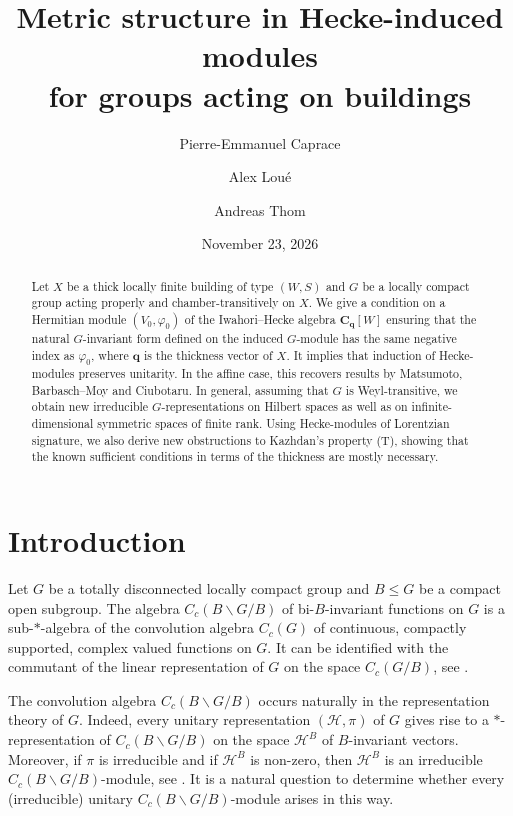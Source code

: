 \documentclass[12pt,a4paper]{amsproc}
\title[Metric structure in Hecke-induced modules]
{Metric structure in Hecke-induced modules\\ for  groups acting on buildings}
\author[P.-E. Caprace]{Pierre-Emmanuel Caprace}
\author[A. Lou\'e]{Alex Lou\'e}
\author[A. Thom]{Andreas Thom}
\date{November 23, 2026}
\theoremstyle{definition}
\newcommand{\CC}{\mathbf C}
\newcommand{\qq}{\mathbf q}
\begin{document}
\begin{abstract}
Let $X$ be a thick locally finite building of type $(W, S)$ and $G$ be a locally compact group acting properly and chamber-transitively on $X$. We give a condition on a Hermitian module $(V_0, \varphi_0)$ of the Iwahori--Hecke algebra $\CC_\qq[W]$ ensuring that the natural $G$-invariant form defined on the induced $G$-module has the same negative index as $\varphi_0$, where $\qq$ is the thickness vector of $X$. It implies that induction of Hecke-modules preserves unitarity. In the affine case, this recovers results by Matsumoto, Barbasch--Moy and Ciubotaru. In general, assuming that $G$ is Weyl-transitive, we obtain new irreducible $G$-representations  on Hilbert spaces as well as on infinite-dimensional symmetric spaces of finite rank. Using Hecke-modules of    Lorentzian signature, we also derive new obstructions to Kazhdan's property (T), showing that the known sufficient conditions in terms of the thickness are mostly necessary. 
\end{abstract}

\maketitle


\section{Introduction}
\label{sec:introduction}

Let $G$ be a totally disconnected locally compact group and $B \leq G$ be a compact open subgroup. The   algebra $C_c(B\backslash G/B)$ of bi-$B$-invariant functions on $G$ is a sub-$*$-algebra of the convolution algebra $C_c(G)$ of continuous, compactly supported, complex valued functions on $G$. It can be identified with the commutant of the linear representation of $G$ on the space $C_c(G/B)$, see \cite[Ch.~IV, Exer.~22]{Bour}. 

The  convolution algebra $C_c(B\backslash G/B)$  occurs    naturally in the representation theory of $G$. Indeed,   every unitary representation $(\mathcal H, \pi)$ of $G$ gives rise to a $*$-representation of $C_c(B\backslash G/B)$ on  the space $\mathcal H^B$ of $B$-invariant vectors. Moreover, if $\pi$ is irreducible and if $\mathcal H^B$ is non-zero, then $\mathcal H^B$ is an irreducible $C_c(B\backslash G/B)$-module, see \cite[Ch.~IV, Theorem 2]{Lang}. It is a natural question to determine whether every (irreducible) unitary $C_c(B\backslash G/B)$-module arises in this way. 
\end{document}
